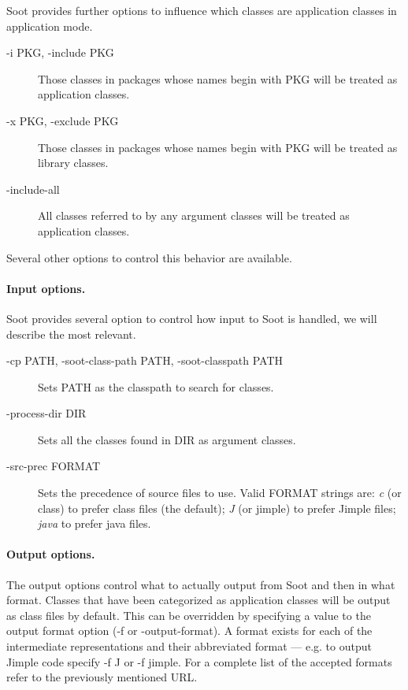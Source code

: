 \documentclass{article}
\begin{document}
Soot provides further options to influence which classes are
application classes in application mode.
\begin{description}
\item[-i PKG, -include PKG] Those classes in packages whose names
  begin with PKG will be treated as application classes.
\item[-x PKG, -exclude PKG] Those classes in packages whose names
  begin with PKG will be treated as library classes.
\item[-include-all] All classes referred to by any argument classes
  will be treated as application classes.
\end{description}
Several other options to control this behavior are available.

\paragraph{Input options.}

Soot provides several option to control how input to Soot is handled,
we will describe the most relevant.
\begin{description}
\item[-cp PATH, -soot-class-path PATH, -soot-classpath PATH] Sets PATH
  as the classpath to search for classes.
\item[-process-dir DIR] Sets all the classes found in DIR as argument
classes.
\item[-src-prec FORMAT] Sets the precedence of source files to
  use. Valid FORMAT strings are: \emph{c} (or class) to prefer class
  files (the default); \emph{J} (or jimple) to prefer Jimple files;
  \emph{java} to prefer java files.
\end{description}

\paragraph{Output options.}

The output options control what to actually output from Soot and then
in what format. Classes that have been categorized as application
classes will be output as class files by default. This can be
overridden by specifying a value to the output format option (-f or
-output-format). A format exists for each of the intermediate
representations and their abbreviated format --- e.g. to output
Jimple code specify -f J or -f jimple. For a complete list of the
accepted formats refer to the previously mentioned URL.
\end{document}
